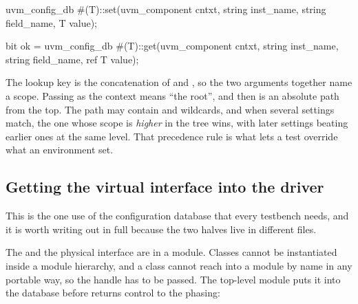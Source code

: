 \begin{uvmcode}
uvm_config_db #(T)::set(uvm_component cntxt, string inst_name,
                        string field_name, T value);

bit ok = uvm_config_db #(T)::get(uvm_component cntxt, string inst_name,
                                 string field_name, ref T value);
\end{uvmcode}

The lookup key is the concatenation of  and
, so the two arguments together name a scope. Passing
 as the context means ``the root'', and then  is an
absolute path from the top. The path may contain \code{*} and 
wildcards, and when several settings match, the one whose scope is
\emph{higher} in the tree wins, with later settings beating earlier ones at
the same level. That precedence rule is what lets a test override what an
environment set.

\subsection{Getting the virtual interface into the driver}
\label{sec:uvm:vif}

%
This is the one use of the configuration database that every testbench needs,
and it is worth writing out in full because the two halves live in different
files.

The \DUT{} and the physical interface are in a module. Classes cannot be
instantiated inside a module hierarchy, and a class cannot reach into a
module by name in any portable way, so the handle has to be passed. The
top-level module puts it into the database before  returns
control to the phasing:


